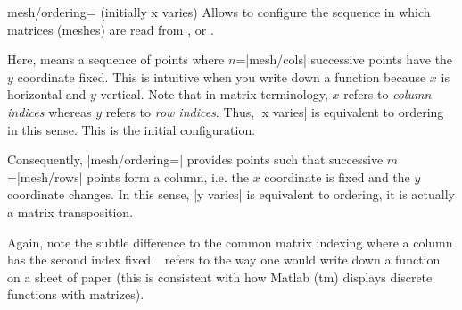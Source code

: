 \begin{pgfplotskey}{mesh/ordering= (initially x varies)}
	Allows to configure the sequence in which matrices (meshes) are read from ,  or .

	Here,  means a sequence of points where $n$=|mesh/cols| successive points have the $y$ coordinate fixed. This is intuitive when you write down a function because $x$ is horizontal and $y$ vertical. Note that in matrix terminology, $x$ refers to \emph{column indices} whereas $y$ refers to \emph{row indices}. Thus, |x varies| is equivalent to  ordering in this sense. This is the initial configuration.
	
\long\def\temporarytest{\noexpand\par}
\begin{codeexample}[newline=\temporarytest]
\end{codeexample}

	Consequently, |mesh/ordering=| provides points such that successive $m$=|mesh/rows| points form a column, i.e. the $x$ coordinate is fixed and the $y$ coordinate changes. In this sense, |y varies| is equivalent to  ordering, it is actually a matrix transposition.
\long\def\temporarytest{\noexpand\par}
\begin{codeexample}[newline=\temporarytest]
\end{codeexample}
	Again, note the subtle difference to the common matrix indexing where a column has the second index fixed. \PGFPlots\ refers to the way one would write down a function on a sheet of paper (this is consistent with how Matlab (tm) displays discrete functions with matrizes).


\end{pgfplotskey}
